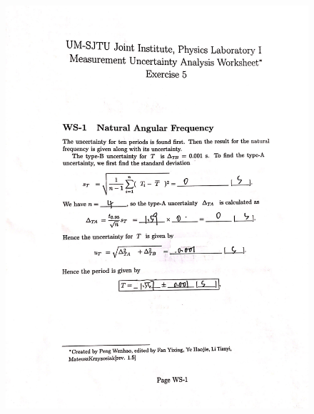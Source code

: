 \documentclass[12pt,a4paper]{article}
\begin{document}
\begin{figure}[t]
    \centering
    \includegraphics[scale=0.25]{newuncer1.jpeg}
\end{figure}
\end{document}
